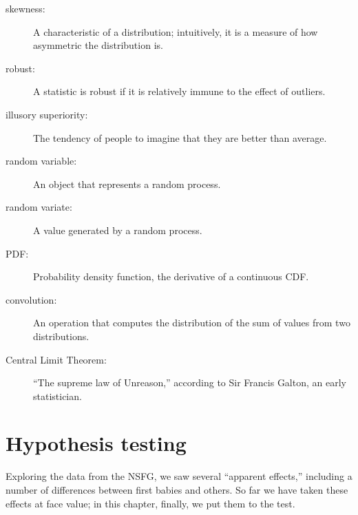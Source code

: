 \documentclass[12pt]{book}
\begin{document}
\begin{description}

\item[skewness:] A characteristic of a distribution; intuitively, it
is a measure of how asymmetric the distribution is.

\item[robust:] A statistic is robust if it is relatively immune to the
  effect of outliers.

\item[illusory superiority:] The tendency of people to imagine that
they are better than average.

\item[random variable:] An object that represents a random process.

\item[random variate:] A value generated by a random process.

\item[PDF:] Probability density function, the derivative of a continuous CDF.

\item[convolution:] An operation that computes the distribution of the
sum of values from two distributions. 



\item[Central Limit Theorem:] ``The supreme law of Unreason,'' according
to Sir Francis Galton, an early statistician.

\end{description}


\chapter{Hypothesis testing}
\label{testing}

Exploring the data from the NSFG, we saw several ``apparent effects,''
including a number of differences between first babies and others.
So far we have taken these effects at face value; in this chapter,
finally, we put them to the test.
\end{document}
